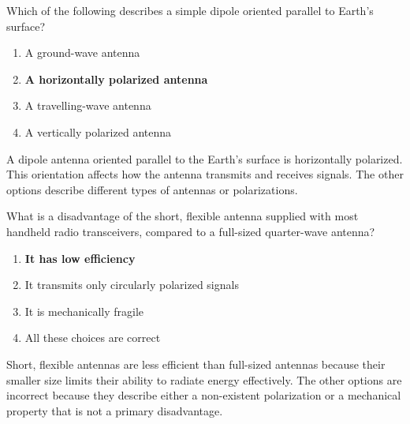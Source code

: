
\begin{tcolorbox}[colback=gray!10!white,colframe=black!75!black,title={T9A03}]
    Which of the following describes a simple dipole oriented parallel to Earth's surface?
    \begin{enumerate}[label=\Alph*,noitemsep]
        \item A ground-wave antenna
        \item \textbf{A horizontally polarized antenna}
        \item A travelling-wave antenna
        \item A vertically polarized antenna
    \end{enumerate}
\end{tcolorbox}
A dipole antenna oriented parallel to the Earth's surface is horizontally polarized. This orientation affects how the antenna transmits and receives signals. The other options describe different types of antennas or polarizations.


\begin{tcolorbox}[colback=gray!10!white,colframe=black!75!black,title={T9A04}]
    What is a disadvantage of the short, flexible antenna supplied with most handheld radio transceivers, compared to a full-sized quarter-wave antenna?
    \begin{enumerate}[label=\Alph*,noitemsep]
        \item \textbf{It has low efficiency}
        \item It transmits only circularly polarized signals
        \item It is mechanically fragile
        \item All these choices are correct
    \end{enumerate}
\end{tcolorbox}
Short, flexible antennas are less efficient than full-sized antennas because their smaller size limits their ability to radiate energy effectively. The other options are incorrect because they describe either a non-existent polarization or a mechanical property that is not a primary disadvantage.


